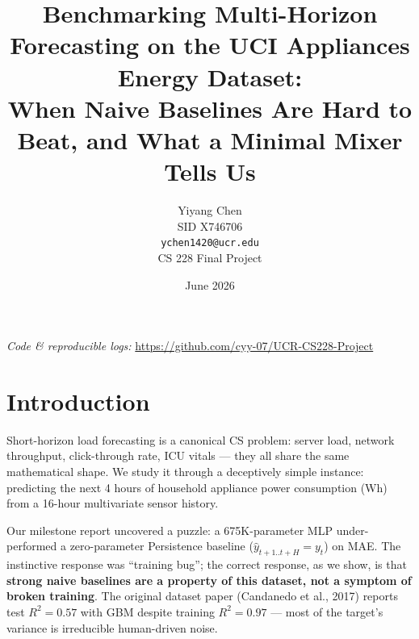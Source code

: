 \documentclass[11pt,letterpaper]{article}
\title{\textbf{Benchmarking Multi-Horizon Forecasting on the UCI Appliances Energy Dataset:\\
When Naive Baselines Are Hard to Beat, and What a Minimal Mixer Tells Us}}
\author{Yiyang Chen \\
  SID X746706 \\
  \texttt{ychen1420@ucr.edu} \\
  CS 228 Final Project}
\date{June 2026}
\begin{document}
\maketitle

\begin{center}
\textit{Code \& reproducible logs:} \url{https://github.com/cyy-07/UCR-CS228-Project}
\end{center}

\vspace{1em}

\section{Introduction}

Short-horizon load forecasting is a canonical CS problem: server load, network
throughput, click-through rate, ICU vitals --- they all share the same
mathematical shape. We study it through a deceptively simple instance:
predicting the next 4 hours of household appliance power consumption (Wh)
from a 16-hour multivariate sensor history.

Our milestone report uncovered a puzzle: a 675K-parameter MLP under-performed
a zero-parameter Persistence baseline ($\hat{y}_{t+1..t+H} = y_t$) on MAE.
The instinctive response was ``training bug''; the correct response, as we
show, is that \textbf{strong naive baselines are a property of this dataset,
not a symptom of broken training}. The original dataset paper
(Candanedo et al., 2017) reports test $R^2 = 0.57$ with GBM despite training
$R^2 = 0.97$ --- most of the target's variance is irreducible human-driven
noise.
\end{document}
